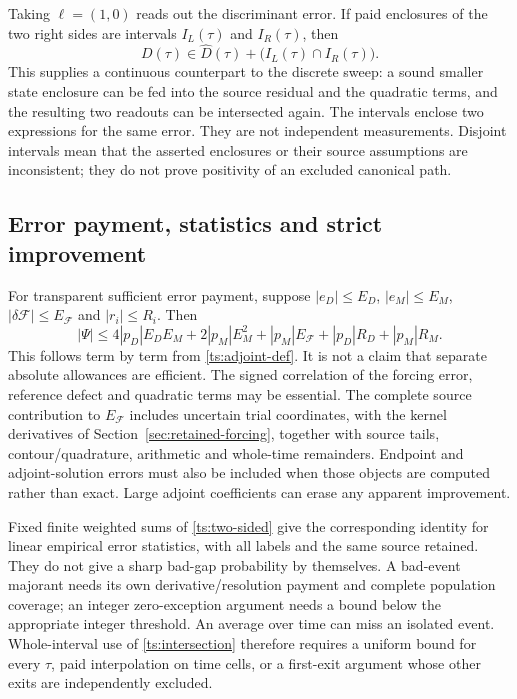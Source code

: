 Taking $\ell=(1,0)$ reads out the discriminant error. If paid enclosures
of the two right sides are intervals $I_L(\tau)$ and $I_R(\tau)$, then
\begin{equation}
 D(\tau)\in\widehat D(\tau)+
                  \bigl(I_L(\tau)\cap I_R(\tau)\bigr).
 \label{ts:intersection}
\end{equation}
This supplies a continuous counterpart to the discrete sweep: a sound
smaller state enclosure can be fed into the source residual and the
quadratic terms, and the resulting two readouts can be intersected again.
The intervals enclose two expressions for the same error. They are not
independent measurements. Disjoint intervals mean that the asserted
enclosures or their source assumptions are inconsistent; they do not
prove positivity of an excluded canonical path.

\subsection{Error payment, statistics and strict improvement}

For transparent sufficient error payment, suppose
$|e_D|\le E_D$, $|e_M|\le E_M$,
$|\delta\mathcal F|\le E_{\mathcal F}$ and $|r_i|\le R_i$.
Then
\begin{equation}
 |\Psi|\le
 4|p_D|E_DE_M+2|p_M|E_M^2+|p_M|E_{\mathcal F}
                    +|p_D|R_D+|p_M|R_M.
 \label{ts:absolute}
\end{equation}
This follows term by term from \eqref{ts:adjoint-def}. It is not a
claim that separate absolute allowances are efficient. The signed
correlation of the forcing error, reference defect and quadratic terms
may be essential. The complete source contribution to
$E_{\mathcal F}$ includes uncertain trial coordinates, with the kernel
derivatives of Section~\ref{sec:retained-forcing}, together with source
tails, contour/quadrature, arithmetic and whole-time remainders. Endpoint
and adjoint-solution errors must also be included when those objects are
computed rather than exact. Large adjoint coefficients can erase any
apparent improvement.

Fixed finite weighted sums of \eqref{ts:two-sided} give the corresponding
identity for linear empirical error statistics, with all labels and the
same source retained. They do not give a sharp bad-gap probability by
themselves. A bad-event majorant needs its own derivative/resolution
payment and complete population coverage; an integer zero-exception
argument needs a bound below the appropriate integer threshold. An
average over time can miss an isolated event. Whole-interval use of
\eqref{ts:intersection} therefore requires a uniform bound for every
$\tau$, paid interpolation on time cells, or a first-exit argument whose
other exits are independently excluded.

